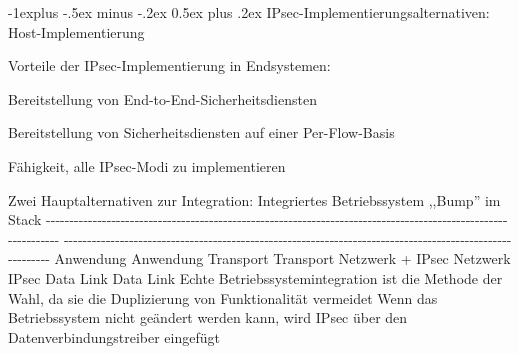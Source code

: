 \documentclass[a4paper]{article}
\makeatletter
\renewcommand{\subsection}{\@startsection{subsection}{2}{0mm}%
 {-1explus -.5ex minus -.2ex}%
 {0.5ex plus .2ex}%
 {\normalfont\normalsize\bfseries}}
\makeatother
\begin{document}
\begin{multicols}{3}
      \subsection{IPsec-Implementierungsalternativen:
            Host-Implementierung}

      \begin{itemize*}
            \item
            Vorteile der IPsec-Implementierung in Endsystemen:

            \begin{itemize*}
                  \item Bereitstellung von End-to-End-Sicherheitsdiensten
                  \item Bereitstellung von Sicherheitsdiensten auf einer Per-Flow-Basis
                  \item Fähigkeit, alle IPsec-Modi zu implementieren
            \end{itemize*}
            \item
            Zwei Hauptalternativen zur Integration: \textbar{} Integriertes
            Betriebssystem \textbar{} ,,Bump'' im Stack \textbar{} \textbar{}
            -\/-\/-\/-\/-\/-\/-\/-\/-\/-\/-\/-\/-\/-\/-\/-\/-\/-\/-\/-\/-\/-\/-\/-\/-\/-\/-\/-\/-\/-\/-\/-\/-\/-\/-\/-\/-\/-\/-\/-\/-\/-\/-\/-\/-\/-\/-\/-\/-\/-\/-\/-\/-\/-\/-\/-\/-\/-\/-\/-\/-\/-\/-\/-\/-\/-\/-\/-\/-\/-\/-\/-\/-\/-\/-\/-\/-\/-\/-\/-\/-\/-\/-\/-\/-\/-\/-\/-\/-\/-\/-\/-\/-\/-\/-\/-\/-\/-\/-\/-\/-\/-\/-\/-\/-\/-\/-\/-\/-\/-
            \textbar{}
            -\/-\/-\/-\/-\/-\/-\/-\/-\/-\/-\/-\/-\/-\/-\/-\/-\/-\/-\/-\/-\/-\/-\/-\/-\/-\/-\/-\/-\/-\/-\/-\/-\/-\/-\/-\/-\/-\/-\/-\/-\/-\/-\/-\/-\/-\/-\/-\/-\/-\/-\/-\/-\/-\/-\/-\/-\/-\/-\/-\/-\/-\/-\/-\/-\/-\/-\/-\/-\/-\/-\/-\/-\/-\/-\/-\/-\/-\/-\/-\/-\/-\/-\/-\/-\/-\/-\/-\/-\/-\/-\/-\/-\/-\/-\/-\/-\/-\/-\/-\/-\/-\/-\/-\/-
            \textbar{} \textbar{} Anwendung \textbar{} Anwendung \textbar{}
            \textbar{} Transport \textbar{} Transport \textbar{} \textbar{}
            Netzwerk + IPsec \textbar{} Netzwerk \textbar{} \textbar{} IPsec
            \textbar{} \textbar{} Data Link \textbar{} Data Link \textbar{}
            \textbar{} \textbar{} \textbar{} Echte Betriebssystemintegration ist
            die Methode der Wahl, da sie die Duplizierung von Funktionalität
            vermeidet \textbar{} Wenn das Betriebssystem nicht geändert werden
            kann, wird IPsec über den Datenverbindungstreiber eingefügt \textbar{}
      \end{itemize*}



\end{multicols}
\end{document}
